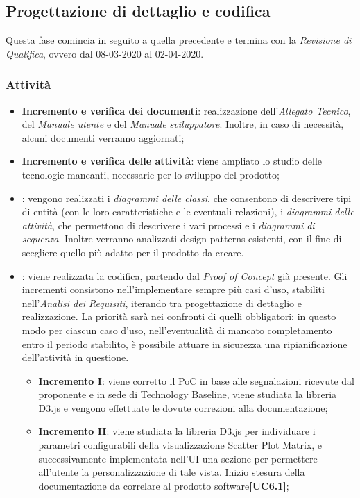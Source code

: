 \subsection{Progettazione di dettaglio e codifica}
Questa fase comincia in seguito a quella precedente e termina con la \textit{Revisione di Qualifica}, ovvero dal 08-03-2020 al 02-04-2020.

\subsubsection{Attività}
\begin{itemize}
	\item \textbf{Incremento e verifica dei documenti}: realizzazione dell'\textit{Allegato Tecnico}, del \textit{Manuale utente} e del \textit{Manuale sviluppatore}. Inoltre, in caso di necessità, alcuni documenti verranno aggiornati;
	\item \textbf{Incremento e verifica delle attività}: viene ampliato lo studio delle tecnologie mancanti, necessarie per lo sviluppo del prodotto; 
	\item \textbf{}: vengono realizzati i \textit{diagrammi delle classi}, che consentono di descrivere tipi di entità (con le loro caratteristiche e le eventuali relazioni), i \textit{diagrammi delle attività}, che permettono di descrivere i vari processi e i \textit{diagrammi di sequenza}. Inoltre verranno analizzati design patterns esistenti, con il fine di scegliere quello più adatto per il prodotto da creare.
	\item \textbf{}: viene realizzata la codifica, partendo dal \textit{Proof of Concept} già presente. Gli incrementi consistono nell'implementare sempre più casi d'uso, stabiliti nell'\textit{Analisi dei Requisiti}, iterando tra progettazione di dettaglio e realizzazione. La priorità sarà nei confronti di quelli obbligatori: in questo modo per ciascun caso d'uso, nell'eventualità di mancato completamento entro il periodo stabilito, è possibile attuare in sicurezza una ripianificazione dell'attività in questione.
	\begin{itemize}
	\item \textbf{Incremento I}: viene corretto il PoC in base alle segnalazioni ricevute dal proponente e in sede di Technology Baseline, viene studiata la libreria D3.js e vengono effettuate le dovute correzioni alla documentazione;
	
	\item \textbf{Incremento II}: viene studiata la libreria D3.js per individuare i parametri configurabili della visualizzazione Scatter Plot Matrix, e successivamente implementata nell'UI una sezione per permettere all'utente la personalizzazione di tale vista. Inizio stesura della documentazione da correlare al prodotto software\textbf{[UC6.1]};
	

\end{itemize}
\end{itemize}
